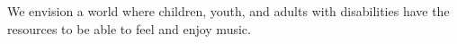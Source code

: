 We envision a world where children, youth, and adults with disabilities have the resources to be able to feel and enjoy music.

